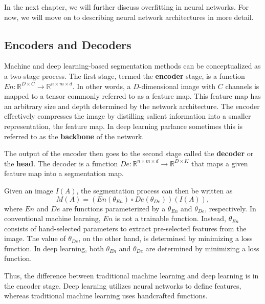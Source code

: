 In the next chapter, we will further discuss overfitting in neural networks. For now, we will move on to describing neural network architectures in more detail.

\subsection{Encoders and Decoders}

Machine and deep learning-based segmentation methods can be conceptualized as a two-stage process. The first stage, termed the \textbf{encoder} stage, is a function $En : \mathbb{R}^{D \times C} \rightarrow \mathbb{R}^{n \times m \times d}$. In other words, a $D$-dimensional image with $C$ channels is mapped to a tensor commonly referred to as a feature map. This feature map has an arbitrary size and depth determined by the network architecture. The encoder effectively compresses the image by distilling salient information into a smaller representation, the feature map. In deep learning parlance sometimes this is referred to as the \textbf{backbone} of the network.

The output of the encoder then goes to the second stage called the \textbf{decoder} or the \textbf{head}. The decoder is a function $De : \mathbb{R}^{n \times m \times d} \rightarrow \mathbb{R}^{D \times K}$ that maps a given feature map into a segmentation map. 

Given an image $I(A)$, the segmentation process can then be written as
\begin{equation}
M(A) = (En(\theta_{En}) \circ De(\theta_{De}))(I(A)),
\end{equation}
where $En$ and $De$ are functions parameterized by a $\theta_{En}$ and $\theta_{De}$, respectively. In conventional machine learning, $En$ is not a trainable function. Instead, $\theta_{En}$ consists of hand-selected parameters to extract pre-selected features from the image. The value of $\theta_{De}$, on the other hand, is determined by minimizing a loss function. In deep learning, both $\theta_{En}$ and $\theta_{De}$ are determined by minimizing a loss function.

Thus, the difference between traditional machine learning and deep learning is in the encoder stage. Deep learning utilizes neural networks to define features, whereas traditional machine learning uses handcrafted functions.

